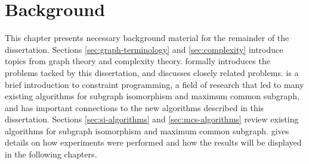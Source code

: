 \chapter{Background}
\label{c:background}

\newcommand{\FourQueens}[2] {
  \begin{tikzpicture}[scale=0.6, every node/.style={black,scale=0.9}]
    \newcommand*{\xMin}{0}%
    \newcommand*{\xMax}{3}%
    \newcommand*{\yMin}{0}%
    \newcommand*{\yMax}{3}%
    \foreach \i / \label in {0/a,1/b,2/c,3/d} {
        \draw [] node at (\i+.5,\yMin-.3) {$\label$};
    }
    \foreach \i / \label in {0/1,1/2,2/3,3/4} {
        \draw [] node at (\xMin-.3,\i+.5) {$\label$};
    }

    \foreach \y in {0,2}{
        \foreach \x in {0,2}{
            \fill[black!8] (\x,\y) rectangle (1+\x,1+\y) rectangle (2+\x,2+\y);}}
    \draw [step=1.0] (0,0) grid (4,4);
    \foreach \x/\y/\m in {#2}
        \draw [] node at (\x,\y) {\m};
    \node[draw,circle,inner sep=1mm] at (-1.4,3.5) {#1};
  \end{tikzpicture}
}

\newcommand{\MCSDomains}[2] {
  \begin{tikzpicture}[scale=0.6, every node/.style={black,scale=0.9}]
    \newcommand*{\xMin}{0}%
    \newcommand*{\xMax}{5}%
    \newcommand*{\yMin}{0}%
    \newcommand*{\yMax}{4}%
    \foreach \i / \label in {0/a,1/b,2/c,3/d,4/e,5/f} {
        \draw [] node at (\i+.5,\yMax+1.4) {$\label$};
    }
    \foreach \i / \label in {4/1,3/2,2/3,1/4,0/5} {
        \draw [] node at (\xMin-.3,\i+.5) {$\label$};
    }

    \draw [step=1.0] (0,0) grid (6,5);
    \foreach \x/\y/\m in {#2}
        \draw [] node at (\x,\y) {\m};
    \node[draw,circle,inner sep=1mm] at (-1.4,3.5) {#1};
  \end{tikzpicture}
}

This chapter presents
necessary background material for the remainder of the dissertation.
Sections \ref{sec:graph-terminology} and
\ref{sec:complexity} introduce topics from graph theory and complexity theory.
 formally introduces the problems tacked by this
dissertation, and  discusses closely related
problems.   is a brief introduction to constraint programming, a
field of research that led to many existing algorithms for subgraph isomorphism
and maximum common subgraph, and has important connections to the new
algorithms described in this dissertation.  Sections \ref{sec:si-algorithms}
and \ref{sec:mcs-algorithms} review existing algorithms for subgraph
isomorphism and maximum common subgraph.   gives
details on how experiments were performed and how the results will be displayed
in the following chapters.

